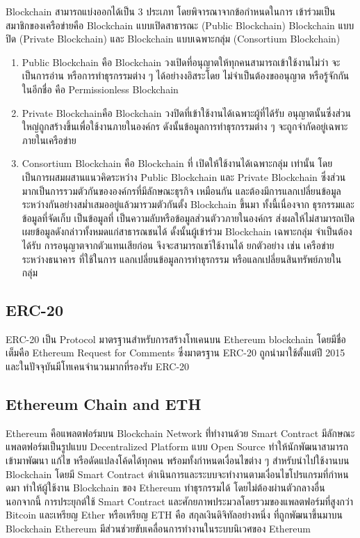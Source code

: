 \documentclass[12pt,oneside,openright,a4paper]{cpe-thai-project}
\begin{document}
\tab Blockchain สามารถแบ่งออกได้เป็น 3 ประเภท โดยพิจารณาจากข้อกำหนดในการ เข้าร่วมเป็นสมาชิกของเครือข่ายคือ Blockchain แบบเปิดสาธารณะ (Public Blockchain) Blockchain แบบปิด (Private Blockchain) และ Blockchain แบบเฉพาะกลุ่ม (Consortium Blockchain) 
\begin{enumerate}[label=\thesubsection.\arabic*,leftmargin=0pt,itemindent=2cm]
\item Public Blockchain คือ Blockchain วงเปิดที่อนุญาตให้ทุกคนสามารถเข้าใช้งานไม่ว่า จะเป็นการอ่าน หรือการทำธุรกรรมต่าง ๆ ได้อย่างงอิสระโดย ไม่จำเป็นต้องขออนุญาต หรือรู้จักกันในอีกชื่อ คือ Permissionless Blockchain
\item Private Blockchainคือ Blockchain วงปิดที่เข้าใช้งานได้เฉพาะผู้ที่ได้รับ อนุญาตนั้นซึ่งส่วนใหญ่ถูกสร้างขึ้นเพื่อใช้งานภายในองค์กร ดังนั้นข้อมูลการทำธุรกรรมต่าง ๆ จะถูกจํากัดอยู่เฉพาะภายในเครือข่าย
\item Consortium Blockchain คือ Blockchain ที่ เปิดให้ใช้งานได้เฉพาะกลุ่ม เท่านั้น โดยเป็นการผสมผสานแนวคิดระหว่าง Public Blockchain และ Private Blockchain ซึ่งส่วนมากเป็นการรวมตัวกันขององค์กรที่มีลักษณะธุรกิจ เหมือนกัน และต้องมีการแลกเปลี่ยนข้อมูลระหว่างกันอย่างสม่ำเสมออยู่แล้วมารวมตัวกันตั้ง Blockchain ขึ้นมา ทั้งนี้เนื่องจาก ธุรกรรมและข้อมูลที่จัดเก็บ เป็นข้อมูลที่ เป็นความลับหรือข้อมูลส่วนตัววภายในองค์กร ส่งผลให้ไม่สามารถเปิดเผยข้อมูลดังกล่าวทั้งหมดแก่สาธารณชนได้ ดั้งนั้นผู้เข้าร่วม Blockchain เฉพาะกลุ่ม จำเป็นต้องได้รับ การอนุญาตจากตัวแทนเสียก่อน จึงจะสามารถเขา้ใช้งานได้ ยกตัวอย่าง เช่น เครือข่ายระหว่างธนาคาร ที่ใช้ในการ แลกเปลี่ยนข้อมูลการทำธุรกรรม หรือแลกเปลี่ยนสินทรัพย์ภายในกลุ่ม
\end{enumerate}

\subsection{ERC-20 \cite{erc20}}
\tab ERC-20 เป็น Protocol มาตรฐานสําหรับการสร้างโทเคนบน Ethereum blockchain โดยมีชื่อเต็มคือ Ethereum Request for Comments ซึ่งมาตรฐาน ERC-20 ถูกนํามาใช้ตั้งแต่ปี 2015 และในปัจจุบันมีโทเคนจํานวนมากที่รองรับ ERC-20

\subsection{Ethereum Chain and ETH\cite{eth}}
\tab Ethereum คือแพลตฟอร์มบน Blockchain Network ที่่ทํางานด้วย Smart Contract มีลักษณะแพลตฟอร์มเป็นรูปแบบ Decentralized Platform แบบ Open Source ทําให้นักพัฒนาสามารถเข้ามาพัฒนา แก้ไข หรือดัดแปลงโค้ดได้ทุกคน พร้อมทั้งกําหนดเงื่อนไขต่าง ๆ สําหรับนําไปใช้งานบน Blockchain โดยมี Smart Contract ดําเนินการและระบบจะทํางานตามเงื่อนไขโปรแกรมที่กําหนดมา ทําให้ผู้ใช้งาน Blockchain ของ Ethereum ทําธุรกรรมได้ โดยไม่ต้องผ่านตัวกลางอื่น นอกจากนี้ การประยุกต์ใช้ Smart Contract และศักยภาพประมวลโดยรวมของแพลตฟอร์มที่สูงกว่า Bitcoin และเหรียญ Ether หรือเหรียญ ETH คือ สกุลเงินดิจิทัลอย่างหนึ่ง ที่ถูกพัฒนาขึ้นมาบน Blockchain Ethereum มีส่วนช่วยขับเคลื่อนการทํางานในระบบนิเวศของ Ethereum
\clearpage
\end{document}
